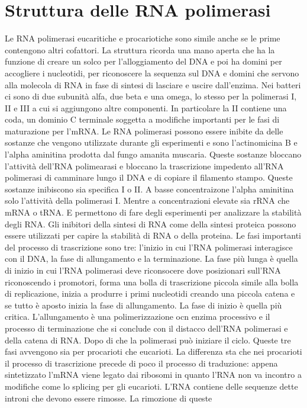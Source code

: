 \section{Struttura delle RNA polimerasi}
Le RNA polimerasi eucaritiche e procariotiche sono simile anche se le prime contengono altri cofattori. La struttura ricorda una mano aperta che ha la funzione di creare un solco per
l'alloggiamento del DNA e poi ha domini per accogliere i nucleotidi, per riconoscere la sequenza sul DNA e domini che servono alla molecola di RNA in fase di sintesi di lasciare e 
uscire dall'enzima. Nei batteri ci sono di due subunit\`a alfa, due beta e una omega, lo stesso per la polimerasi I, II e III a cui si aggiungono altre componenti. In particolare la
II contiene una coda, un dominio C terminale soggetta a modifiche importanti per le fasi di maturazione per l'mRNA. Le RNA polimerasi possono essere inibite da delle sostanze che 
vengono utilizzate durante gli esperimenti e sono l'actinomicina B e l'alpha aminitina prodotta dal fungo amanita muscaria. Queste sostanze bloccano l'attivit\`a dell'RNA polimearasi e 
bloccano la trascrizione impedento all'RNA polimerasi di camminare lungo il DNA e di copiare il filamento stampo. Queste sostanze inibiscono sia specifica I o II. A basse concentraizone
l'alpha aminitina solo l'attivit\`a della polimerasi I. Mentre a concentrazioni elevate sia rRNA che mRNA o tRNA. E permettono di fare degli esperimenti per analizzare la stabilit\`a 
degli RNA. Gli inibitori della sintesi di RNA come della sintesi proteica possono essere utilizzati per capire la stabilit\`a di RNA o della proteina. Le fasi importanti del processo di
trascrizione sono tre: l'inizio in cui l'RNA polimerasi interagisce con il DNA, la fase di allungamento e la terminazione. La fase pi\`u lunga \`e quella di inizio in cui l'RNA polimerasi
deve riconsocere dove posizionari sull'RNA riconoscendo i promotori, forma una bolla di trascrizione piccola simile alla bolla di replicazione, inizia a produrre i primi nucleotidi 
creando una piccola catena e se tutto \`e aposto inizia la fase di allungamento. La fase di inizio \`e quella pi\`u critica. L'allungamento \`e una polimerizzazione ocn enzima processivo
e il processo di terminazione che si conclude con il distacco dell'RNA polimerasi e della catena di RNA. Dopo di che la polimerasi pu\`o iniziare il ciclo. Queste tre fasi avvengono sia
per procarioti che eucarioti. La differenza sta che nei procarioti il processo di trascrizione precede di poco il processo di traduzione: appena sintetizzato l'mRNA viene legato dai 
ribosomi in quanto l'RNA non va incontro a modifiche come lo splicing per gli eucarioti. L'RNA contiene delle sequenze dette introni che devono essere rimosse. La rimozione di queste
